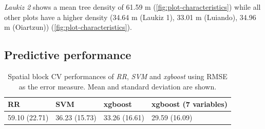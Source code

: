 \documentclass[review]{elsarticle}
\begin{document}
\textit{Laukiz 2} shows a mean tree density of 61.59 m (\autoref{fig:plot-characteristics}) while all other plots have a higher density (34.64 m (Laukiz 1), 33.01 m (Luiando), 34.96 m (Oiartzun)) (\autoref{fig:plot-characteristics}).

\subsection{Predictive performance}

\begin{table}[t!]
\centering
\caption[t]{Spatial block \ac{CV} performances of \textit{RR}, \textit{SVM} and \textit{xgboost} using \ac{RMSE} as the error measure.
	Mean and standard deviation are shown.}
\begingroup\footnotesize
\begin{tabular}{llll}
	RR            & SVM           & xgboost       & xgboost (7 variables) \\
	\hline
	59.10 (22.71) & 36.23 (15.73) & 33.26 (16.61) & 29.59   (16.09)       \\
	\bottomrule
\end{tabular}
\endgroup
\label{tab:model_comparison}
\end{table}
\end{document}
